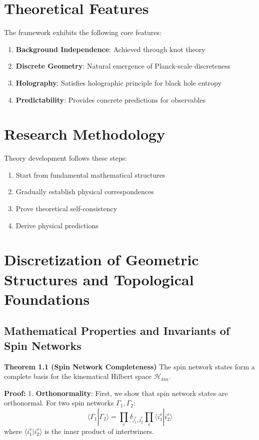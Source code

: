 \documentclass[12pt,a4paper]{article}
\begin{document}
\section*{Theoretical Features}

The framework exhibits the following core features:

\begin{enumerate}
\item \textbf{Background Independence}: Achieved through knot theory
\item \textbf{Discrete Geometry}: Natural emergence of Planck-scale discreteness
\item \textbf{Holography}: Satisfies holographic principle for black hole entropy
\item \textbf{Predictability}: Provides concrete predictions for observables
\end{enumerate}

\section*{Research Methodology}

Theory development follows these steps:
\begin{enumerate}
\item Start from fundamental mathematical structures
\item Gradually establish physical correspondences
\item Prove theoretical self-consistency
\item Derive physical predictions
\end{enumerate}

\section{Discretization of Geometric Structures and Topological Foundations}

\subsection{Mathematical Properties and Invariants of Spin Networks}

\textbf{Theorem 1.1 (Spin Network Completeness)}
The spin network states form a complete basis for the kinematical Hilbert space $\mathcal{H}_{kin}$.

\textbf{Proof:}
1. \textbf{Orthonormality}:
   First, we show that spin network states are orthonormal. For two spin networks $\Gamma_1, \Gamma_2$:
   \[
   \langle\Gamma_1|\Gamma_2\rangle = \prod_{e} \delta_{j_1^e,j_2^e} \prod_{v} \langle i_1^v|i_2^v\rangle
   \]
   where $\langle i_1^v|i_2^v\rangle$ is the inner product of intertwiners.
\end{document}
